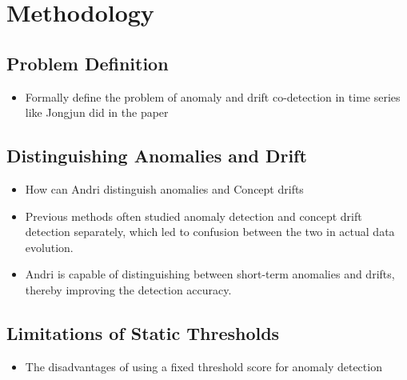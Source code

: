 \chapter{Methodology}

\section{Problem Definition}
\begin{itemize}
    \item Formally define the problem of anomaly and drift co-detection in time series like Jongjun did in the paper

\end{itemize}


\section{Distinguishing Anomalies and Drift}
\begin{itemize}
    \item How can Andri distinguish anomalies and Concept drifts
    \item Previous methods often studied anomaly detection and concept drift detection separately, which led to confusion between the two in actual data evolution.
    \item Andri is capable of distinguishing between short-term anomalies and drifts, thereby improving the detection accuracy.
\end{itemize}


\section{Limitations of Static Thresholds}
\begin{itemize}
    \item The disadvantages of using a fixed threshold score for anomaly detection
\end{itemize}


